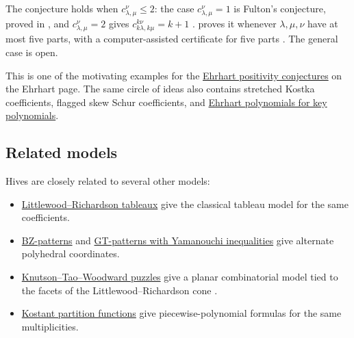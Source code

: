 The conjecture holds when $c^{\nu}_{\lambda,\mu}\leq2$: the case
$c^{\nu}_{\lambda,\mu}=1$ is Fulton's conjecture, proved in
\cite{KnutsonTaoWoodward2004}, and $c^{\nu}_{\lambda,\mu}=2$ gives
$c^{k\nu}_{k\lambda,k\mu}=k+1$ \cite{Ikenmeyer2016,Sherman2017}.
 proves it whenever $\lambda,\mu,\nu$ have at most five
parts, with a computer-assisted certificate for five parts
\cite[Thms.~2--3]{Ferudun2026x}.  The general case is open.

This is one of the motivating examples for the
\hyperref[ehrhartConjecturalPositivity]{Ehrhart positivity conjectures} on
the Ehrhart page.  The same circle of ideas also contains stretched Kostka
coefficients, flagged skew Schur coefficients, and
\hyperref[keyEhrhart]{Ehrhart polynomials for key polynomials}.

\subsection[hiveRelatedModels]{Related models}

Hives are closely related to several other models:
\begin{itemize}
\item \hyperref[lrTableaux]{Littlewood--Richardson tableaux} give the
classical tableau model for the same coefficients.
\item \hyperref[bzPatterns]{BZ-patterns} and
\hyperref[gtLR]{GT-patterns with Yamanouchi inequalities} give alternate
polyhedral coordinates.
\item \hyperref[knutsonTaoWoodwardPuzzles]{Knutson--Tao--Woodward puzzles}
give a planar combinatorial model tied to the facets of the
Littlewood--Richardson cone \cite{KnutsonTaoWoodward2004}.
\item \hyperref[kostantPartitionFunction]{Kostant partition functions} give
piecewise-polynomial formulas for the same multiplicities.
\end{itemize}
